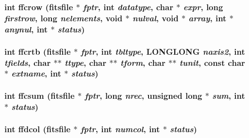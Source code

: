 \subsubsection{\setlength{\rightskip}{0pt plus 5cm}int ffcrow (\bf{fitsfile} $\ast$ {\em fptr}, int {\em datatype}, char $\ast$ {\em expr}, long {\em firstrow}, long {\em nelements}, void $\ast$ {\em nulval}, void $\ast$ {\em array}, int $\ast$ {\em anynul}, int $\ast$ {\em status})}\label{test_2shm__client_2fitsio_8h_7460392e7c0487148565dc632faae6f9}


\subsubsection{\setlength{\rightskip}{0pt plus 5cm}int ffcrtb (\bf{fitsfile} $\ast$ {\em fptr}, int {\em tbltype}, \bf{LONGLONG} {\em naxis2}, int {\em tfields}, char $\ast$$\ast$ {\em ttype}, char $\ast$$\ast$ {\em tform}, char $\ast$$\ast$ {\em tunit}, const char $\ast$ {\em extname}, int $\ast$ {\em status})}\label{test_2shm__client_2fitsio_8h_9e0996d3514ac3a9395ffe53f47ae47c}


\subsubsection{\setlength{\rightskip}{0pt plus 5cm}int ffcsum (\bf{fitsfile} $\ast$ {\em fptr}, long {\em nrec}, unsigned long $\ast$ {\em sum}, int $\ast$ {\em status})}\label{test_2shm__client_2fitsio_8h_ed833bcd8507fea7a754cf607a386837}


\subsubsection{\setlength{\rightskip}{0pt plus 5cm}int ffdcol (\bf{fitsfile} $\ast$ {\em fptr}, int {\em numcol}, int $\ast$ {\em status})}\label{test_2shm__client_2fitsio_8h_1ff2796da87658614b59e50b787208ad}


